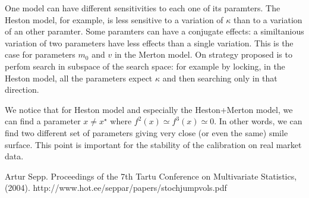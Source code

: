 \documentclass[12pt,a4paper]{article}
\begin{document}
One model can have different sensitivities to each one of its
paramters. The Heston model, for example, is less sensitive to a
variation of $\kappa$  than to a variation of an other paramter.  
Some paramters can have a conjugate effects: a similtanious variation
of two parameters have less effects than a single variation. This is
the case for parameters $m_0$ and $v$ in the Merton model. 
On strategy proposed is to perfom search in subspace of the search
space: for example by locking, in the Heston model, all the parameters
expect $\kappa$ and then searching only in that direction. 

We notice that for Heston model and especially the Heston+Merton
model, we can find a parameter $x\neq x^\star$ where $f^2(x) \simeq
f^3(x) \simeq 0$. In other words, we can find two different set of
parameters giving very close (or even the same) smile surface. This
point is important for the stability of the calibration on real market
data.

%
%
\begin{thebibliography}{1}
Artur Sepp.
\newblock Proceedings of the 7th Tartu Conference on Multivariate
  Statistics, (2004).
\newblock http://www.hot.ee/seppar/papers/stochjumpvols.pdf
\end{thebibliography}
%
\end{document}
